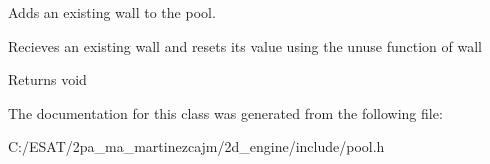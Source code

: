 Adds an existing wall to the pool. 

Recieves an existing wall and resets it\textquotesingle{}s value using the unuse function of wall

\begin{DoxyReturn}{Returns}
void 
\end{DoxyReturn}


The documentation for this class was generated from the following file\+:\begin{DoxyCompactItemize}
\item 
C\+:/\+E\+S\+A\+T/2pa\+\_\+ma\+\_\+martinezcajm/2d\+\_\+engine/include/pool.\+h\end{DoxyCompactItemize}
